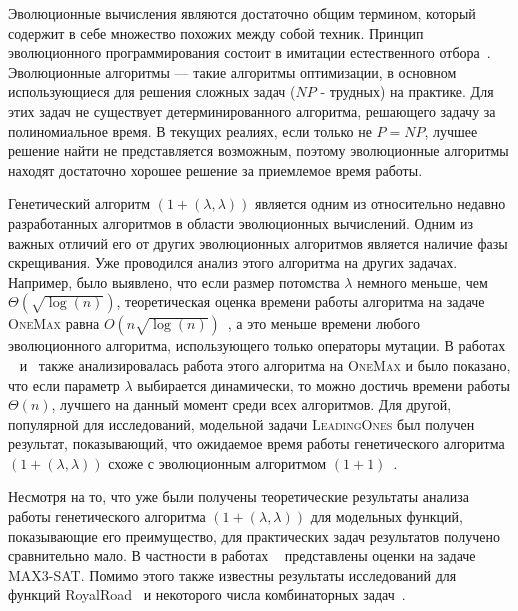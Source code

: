 \documentclass[times]{itmo-student-thesis}
\newcommand{\alglambda}{${(1 + (\lambda , \lambda))}$\xspace}
\newcommand{\onemax}{\textsc{OneMax}\xspace}
\newcommand{\leadingones}{\textsc{LeadingOnes}\xspace}
\begin{document}

\tableofcontents

\startprefacepage
Эволюционные вычисления являются достаточно общим термином, который содержит в себе множество похожих между собой техник.
Принцип эволюционного программирования состоит в имитации естественного отбора~\cite{Skobtsov08}.
Эволюционные алгоритмы --- такие алгоритмы оптимизации, в основном использующиеся для решения сложных задач ($NP$ - трудных) на практике.
Для этих задач не существует детерминированного алгоритма, решающего задачу за полиномиальное время.
В текущих реалиях, если только не $P = NP$, лучшее решение найти не представляется возможным, поэтому эволюционные алгоритмы находят достаточно хорошее решение за приемлемое время работы.

Генетический алгоритм \alglambda является одним из относительно недавно разработанных алгоритмов в области эволюционных вычислений. Одним из важных отличий его от других эволюционных алгоритмов является наличие фазы скрещивания.
Уже проводился анализ этого алгоритма на других задачах.
Например, было выявлено, что если размер потомства $\lambda$ немного меньше, чем $\Theta(\sqrt{\log(n)})$, теоретическая оценка времени работы алгоритма на задаче \onemax равна $O(n\sqrt{\log(n)})$~\cite{DoerrD18}, а это меньше времени любого эволюционного алгоритма, использующего только операторы мутации.
В работах ~\cite{DoerrD18} и~\cite{AntipovBD20} также анализировалась работа этого алгоритма на \onemax и было показано, что если параметр $\lambda$ выбирается динамически, то можно достичь времени работы $\Theta(n)$, лучшего на данный момент среди всех алгоритмов.
Для другой, популярной для исследований, модельной задачи  \leadingones был получен результат, показывающий, что ожидаемое время работы генетического алгоритма \alglambda схоже с эволюционным алгоритмом $(1+1)$~\cite{AntipovDK19}.

Несмотря на то, что уже были получены теоретические результаты анализа работы генетического алгоритма \alglambda для модельных функций, показывающие его преимущество, для практических задач результатов получено сравнительно мало.
В частности в работах ~\cite{BuzdalovD17, GoldmanP14} представлены оценки на задаче MAX3-SAT.
Помимо этого также известны результаты исследований для функций RoyalRoad~\cite{DoerrDE15} и некоторого числа комбинаторных задач~\cite{MironovichB15}.
\end{document}
